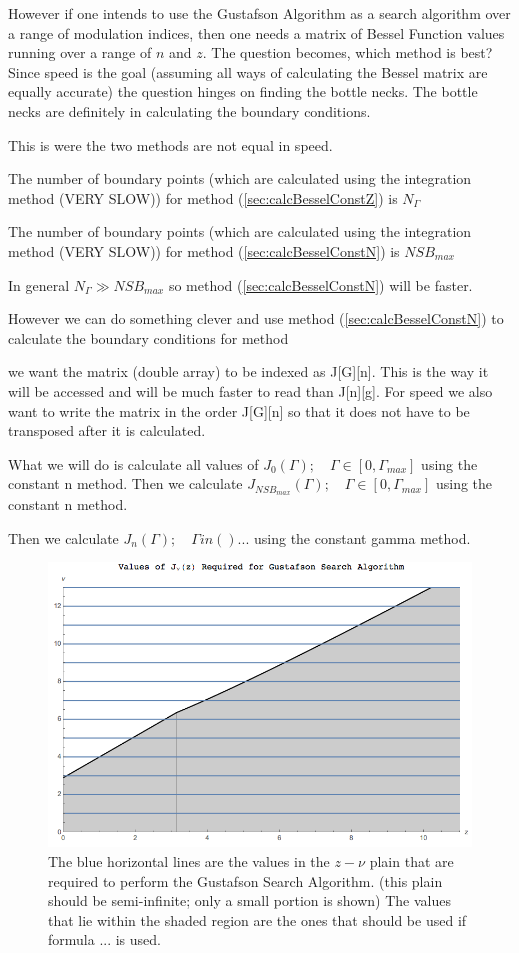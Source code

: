\documentclass[onecolumn, groupedaddress, 10pt]{revtex4-1}
\begin{document}
However if one intends to use the Gustafson Algorithm as a search algorithm over a range of modulation indices, then one needs a matrix of Bessel Function values running over a range of $n$ and $z$.  The question becomes, which method is best?  Since speed is the goal (assuming all ways of calculating the Bessel matrix are equally accurate) the question hinges on finding the bottle necks.  The bottle necks are definitely in calculating the boundary conditions.

This is were the two methods are not equal in speed.  

The number of boundary points (which are calculated using the integration method (VERY SLOW)) for method (\ref{sec:calcBesselConstZ}) is $N_\Gamma$

The number of boundary points (which are calculated using the integration method (VERY SLOW)) for method (\ref{sec:calcBesselConstN}) is $NSB_{max}$

In general $N_\Gamma \gg NSB_{max}$ so method (\ref{sec:calcBesselConstN}) will be faster.

However we can do something clever and use method (\ref{sec:calcBesselConstN}) to calculate the boundary conditions for method 

we want the matrix (double array) to be indexed as J[G][n].  This is the way it will be accessed and will be much faster to read than J[n][g].  For speed we also want to write the matrix in the order J[G][n] so that it does not have to be transposed after it is calculated. 

What we will do is calculate all values of $J_0 (\Gamma); \quad \Gamma \in [0, \Gamma_{max}]$ using the constant n method.  Then we calculate $J_{NSB_{max}} (\Gamma); \quad \Gamma \in [0, \Gamma_{max}]$ using the constant n method.  

Then we calculate $J_n (\Gamma); \quad \Gamma in () ...$ using the constant gamma method.


\begin{figure}[H]
	\centering
	\includegraphics[width=.75\linewidth]{requiredBesselFunctionValues}
	\caption{The blue horizontal lines are the values in the $z-\nu$ plain that are required to perform the Gustafson Search Algorithm.  (this plain should be semi-infinite; only a small portion is shown)  The values that lie within the shaded region are the ones that should be used if formula ... is used.}
\end{figure}
\end{document}
